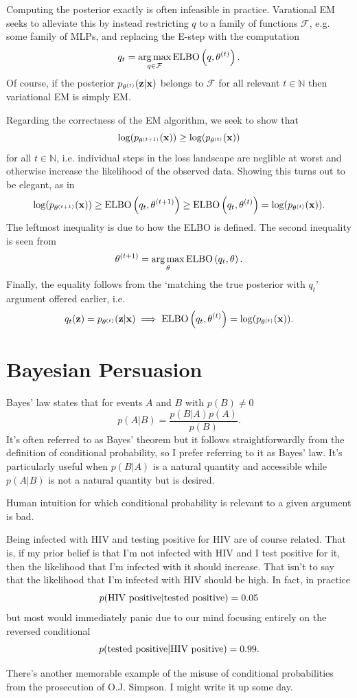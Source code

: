 \documentclass[11pt]{article}
\begin{document}
\begin{appendices}
\begin{tcolorbox}[title={\centering\textbf{Variational EM}}, colback=myLightBlue, colbacktitle=myDarkBlue, colframe=myDarkBlue, coltitle=white]
    Computing the posterior exactly is often infeasible in practice. Varational EM seeks to alleviate this by instead restricting $q$ to a family of functions $\mathcal{F}$, e.g. some family of MLPs, and replacing the E-step with the computation
    $$
    q_t
    =
    \operatorname*{arg\,max}_{q\in\mathcal{F}}\text{ELBO}\left(q,\theta^{(t)}\right).
    $$
    Of course, if the posterior $p_{\theta^{(t)}}(\mathbf{z}|\mathbf{x})$ belongs to $\mathcal{F}$ for all relevant $t\in\mathbb{N}$ then variational EM is simply EM.
\end{tcolorbox}
Regarding the correctness of the EM algorithm, we seek to show that
$$
\log(p_{\theta^{(t+1)}}(\mathbf{x}))
\geq
\log(p_{\theta^{(t)}}(\mathbf{x}))
$$
for all $t\in\mathbb{N}$, i.e. individual steps in the loss landscape are neglible at worst and otherwise increase the likelihood of the observed data. Showing this turns out to be elegant, as in
$$
\log(p_{\theta^{(t+1)}}(\mathbf{x}))
\geq
\text{ELBO}\left(q_t,\theta^{(t+1)}\right)
\geq
\text{ELBO}\left(q_t,\theta^{(t)}\right)
=
\log(p_{\theta^{(t)}}(\mathbf{x})).
$$
The leftmost inequality is due to how the ELBO is defined. The second inequality is seen from
$$
\theta^{(t+1)}
=
\operatorname*{arg\,max}_{\theta}\text{ELBO}\left(q_t,\theta\right).
$$
Finally, the equality follows from the `matching the true posterior with $q_t$' argument offered earlier, i.e.
$$
q_t(\mathbf{z})=p_{\theta^{(t)}}(\mathbf{z}|\mathbf{x})
\implies
\text{ELBO}\left(q_t,\theta^{(t)}\right)=\log(p_{\theta^{(t)}}(\mathbf{x})).
$$

\section{Bayesian Persuasion}
Bayes' law states that for events $A$ and $B$ with $p(B)\neq0$
$$
p(A|B)
=
\frac{p(B|A)p(A)}{p(B)}.
$$
It's often referred to as Bayes' theorem but it follows straightforwardly from the definition of conditional probability, so I prefer referring to it as Bayes' law. It's particularly useful when $p(B|A)$ is a natural quantity and accessible while $p(A|B)$ is not a natural quantity but is desired.

Human intuition for which conditional probability is relevant to a given argument is bad.
\begin{example}
    Being infected with HIV and testing positive for HIV are of course related. That is, if my prior belief is that I'm not infected with HIV and I test positive for it, then the likelihood that I'm infected with it should increase. That isn't to say that the likelihood that I'm infected with HIV should be high. In fact, in practice
    $$
    p(\textnormal{HIV positive}|\textnormal{tested positive})
    =
    0.05
    $$
    but most would immediately panic due to our mind focusing entirely on the reversed conditional
    $$
    p(\textnormal{tested positive}|\textnormal{HIV positive})
    =
    0.99.
    $$
\end{example}
There's another memorable example of the misuse of conditional probabilities from the prosecution of O.J. Simpson. I might write it up some day.


\end{appendices}
\end{document}
